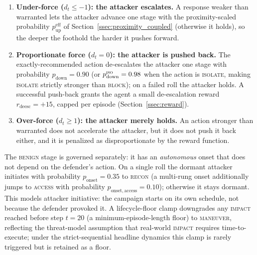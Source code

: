\begin{enumerate}
    \item \textbf{Under-force ($d_t \leq -1$): the attacker escalates.} A response weaker than warranted lets the attacker advance one stage with the proximity-scaled probability $p_{\mathrm{up}}^{\mathrm{eff}}$ of Section~\ref{ssec:proximity_coupled} (otherwise it holds), so the deeper the foothold the harder it pushes forward.
    \item \textbf{Proportionate force ($d_t = 0$): the attacker is pushed back.} The exactly-recommended action de-escalates the attacker one stage with probability $p_{\mathrm{down}} = 0.90$ (or $p_{\mathrm{down}}^{\textsc{iso}} = 0.98$ when the action is \textsc{isolate}, making \textsc{isolate} strictly stronger than \textsc{block}); on a failed roll the attacker holds. A successful push-back grants the agent a small de-escalation reward $r_{\mathrm{deesc}} = +15$, capped per episode (Section~\ref{ssec:reward}).
    \item \textbf{Over-force ($d_t \geq 1$): the attacker merely holds.} An action stronger than warranted does not accelerate the attacker, but it does not push it back either, and it is penalized as disproportionate by the reward function.
\end{enumerate}
The \textsc{benign} stage is governed separately: it has an \emph{autonomous} onset that does not depend on the defender's action. On a single roll the dormant attacker initiates with probability $p_{\mathrm{onset}} = 0.35$ to \textsc{recon} (a multi-rung onset additionally jumps to \textsc{access} with probability $p_{\mathrm{onset,access}} = 0.10$); otherwise it stays dormant. This models attacker initiative: the campaign starts on its own schedule, not because the defender provoked it. A lifecycle-floor clamp downgrades any \textsc{impact} reached before step $t = 20$ (a minimum-episode-length floor) to \textsc{maneuver}, reflecting the threat-model assumption that real-world \textsc{impact} requires time-to-execute; under the strict-sequential headline dynamics this clamp is rarely triggered but is retained as a floor.

